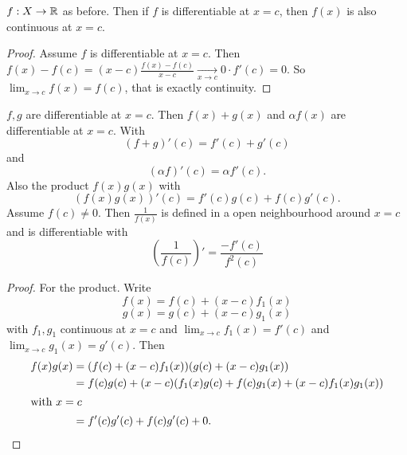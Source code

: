 \begin{proposition}\label{prop:diffcont}
    $f : X \to \mathbb{R}$ as before.
    Then if $f$ is differentiable at $x = c$,
    then $f(x)$ is also continuous at $x = c$.
\end{proposition}
\begin{proof}
    Assume $f$ is differentiable at $x = c$.
    Then $f(x) - f(c) = (x - c) \frac{f(x) - f(c)}{x - c} \xrightarrow[x \to c]{} 0 \cdot f'(c) = 0$.
    So $\lim_{x \to c}f(x) = f(c)$,
    that is exactly continuity.
\end{proof}

\begin{theorem}\label{thm:sum_diff_atc}
    $f, g$ are differentiable at $x = c$.
    Then $f(x) + g(x)$ and $\alpha f(x)$ are differentiable at $x = c$.
    With
    \[
    (f + g)'(c) = f'(c) + g'(c)
    \]
    and
    \[
    (\alpha f)'(c) = \alpha f'(c).
    \]
    Also the product $f(x)g(x)$ with
    \[
    (f(x)g(x))'(c) = f'(c)g(c) + f(c)g'(c).
    \]
    Assume $f(c) \neq 0$.
    Then $\frac{1}{f(x)}$ is defined in a open neighbourhood around $x = c$ and is differentiable with
    \[
    \left(\frac{1}{f(c)}\right)' = \frac{-f'(c)}{f ^ 2(c)}
    \]
\end{theorem}
\begin{proof}
    For the product.
    Write
    \[
    f(x) = f(c) + (x - c)f_1(x)
    \]
    \[
    g(x) = g(c) + (x - c)g_1(x)
    \]
    with $f_1, g_1$ continuous at $x = c$ and $\lim_{x \to c}f_1(x) = f'(c)$ and $\lim_{x \to c}g_1(x) = g'(c)$.
    Then
    \begin{align*}
        f(x)g(x) &= (f(c) + (x - c)f_1(x))(g(c) + (x - c)g_1(x)) \\
        &= f(c)g(c) + (x - c)(f_1(x)g(c) + f(c)g_1(x) + (x - c)f_1(x)g_1(x)) \\
        \intertext{with $x = c$}
        &= f'(c)g'(c) + f(c)g'(c) + 0.
    \end{align*}
\end{proof}

